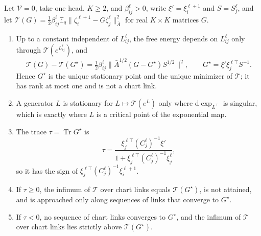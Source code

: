 \documentclass[twoside,11pt]{article}
\begin{document}
\begin{proposition}
\label{prop:app_chart_infimum}
Let $\mathcal V=0$, take one head, $K\ge2$, and $\beta_{ij}^\ell>0$, write $\xi'=\xi_i^{\ell+1}$ and $S=S_j^\ell$, and let $\mathcal T(G)=\tfrac12\beta_{ij}^\ell\mathbb E_q\|\zeta_i^{\ell+1}-G\zeta_j^\ell\|_{\bar A}^2$ for real $K\times K$ matrices $G$.
\begin{enumerate}
\item Up to a constant independent of $L_{ij}^\ell$, the free energy depends on $L_{ij}^\ell$ only through $\mathcal T(e^{L_{ij}^\ell})$, and
\begin{equation}
\mathcal T(G)-\mathcal T(G^\star)=\tfrac12\beta_{ij}^\ell\bigl\|\bar A^{1/2}(G-G^\star)S^{1/2}\bigr\|^2,\qquad G^\star=\xi'\xi_j^{\ell\top}S^{-1}.
\label{eq:app_quadratic_identity}
\end{equation}
Hence $G^\star$ is the unique stationary point and the unique minimizer of $\mathcal T$; it has rank at most one and is not a chart link.
\item A generator $L$ is stationary for $L\mapsto\mathcal T(e^L)$ only where $\mathrm d\exp_{L^\top}$ is singular, which is exactly where $L$ is a critical point of the exponential map.
\item The trace $\tau=\operatorname{Tr}G^\star$ is
\begin{equation}
\tau=\frac{\xi_j^{\ell\top}(C_j^\ell)^{-1}\xi'}{1+\xi_j^{\ell\top}(C_j^\ell)^{-1}\xi_j^\ell},
\label{eq:app_trace_sign}
\end{equation}
so it has the sign of $\xi_j^{\ell\top}(C_j^\ell)^{-1}\xi_i^{\ell+1}$.
\item If $\tau\ge0$, the infimum of $\mathcal T$ over chart links equals $\mathcal T(G^\star)$, is not attained, and is approached only along sequences of links that converge to $G^\star$.
\item If $\tau<0$, no sequence of chart links converges to $G^\star$, and the infimum of $\mathcal T$ over chart links lies strictly above $\mathcal T(G^\star)$.
\end{enumerate}
\end{proposition}
\end{document}
